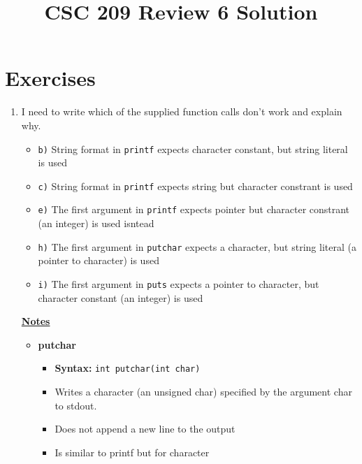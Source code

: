 \documentclass[12pt]{article}
\begin{document}
\title{CSC 209 Review 6 Solution}
\maketitle

\bigskip

\section{Exercises}

\begin{enumerate}[1.]
    \item

    I need to write which of the supplied function calls don't work and explain why.

    \bigskip

    \begin{itemize}
        \item \texttt{b)} String format in \texttt{printf} expects character constant, but string literal is used
        \item \texttt{c)} String format in \texttt{printf} expects string but character constrant is used
        \item \texttt{e)} The first argument in \texttt{printf} expects pointer but character constrant (an integer) is used isntead
        \item \texttt{h)} The first argument in \texttt{putchar} expects a character, but string literal (a pointer to character) is used
        \item \texttt{i)} The first argument in \texttt{puts} expects a pointer to character, but character constant (an integer) is used
    \end{itemize}

    \underline{\textbf{Notes}}

    \begin{itemize}
        \item \textbf{putchar}

        \begin{itemize}
            \item \textbf{Syntax:} \texttt{int putchar(int char)}
            \item Writes a character (an unsigned char) specified by the argument char to stdout.
            \item Does not append a new line to the output
            \item Is similar to printf but for character
        \end{itemize}


\end{itemize}
\end{enumerate}
\end{document}
